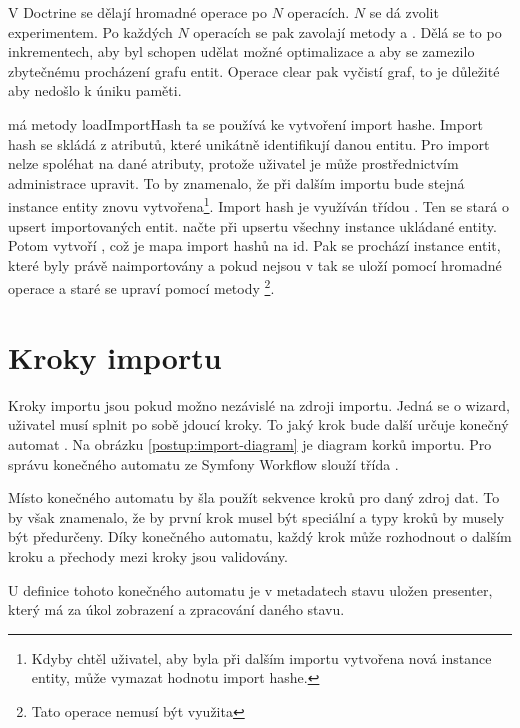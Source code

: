 V Doctrine se dělají hromadné operace po $N$ operacích. $N$ se dá zvolit experimentem.
Po každých $N$ operacích se pak zavolají metody  a . Dělá se to po inkrementech, aby  byl schopen udělat možné optimalizace a aby se zamezilo zbytečnému procházení grafu entit. Operace clear pak vyčistí graf, to je důležité aby nedošlo k úniku paměti.

 má metody loadImportHash ta se používá ke vytvoření import hashe. Import hash se skládá z atributů, které unikátně identifikují danou entitu. Pro import nelze spoléhat na dané atributy, protože uživatel je může prostřednictvím administrace upravit. To by znamenalo, že při dalším importu bude stejná instance entity znovu vytvořena\footnote{Kdyby chtěl uživatel, aby byla při dalším importu vytvořena nová instance entity, může vymazat hodnotu import hashe.}.
Import hash je využíván třídou . Ten se stará o upsert importovaných entit.
 načte při upsertu všechny instance ukládané entity.
Potom vytvoří , což je mapa import hashů na id.
Pak se prochází instance entit, které byly právě naimportovány a pokud nejsou v  tak se uloží pomocí hromadné operace a staré  se upraví pomocí metody \footnote{Tato operace nemusí být využita}.


\section{Kroky importu}

Kroky importu jsou pokud možno nezávislé na zdroji importu. 
Jedná se o wizard, uživatel musí splnit po sobě jdoucí kroky. To jaký krok bude další určuje konečný automat .
Na obrázku \ref{postup:import-diagram} je diagram korků importu.
Pro správu konečného automatu ze Symfony Workflow slouží třída .

Místo konečného automatu by šla použít sekvence kroků pro daný zdroj dat. To by však znamenalo, že by první krok musel být speciální a typy kroků by musely být předurčeny. Díky konečného automatu, každý krok může rozhodnout o dalším kroku a přechody mezi kroky jsou validovány.

U definice tohoto konečného automatu je v metadatech stavu uložen presenter, který má za úkol zobrazení a zpracování daného stavu. 

